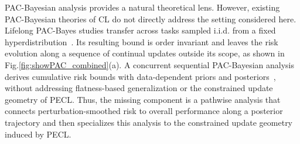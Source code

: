 \documentclass{article}
\begin{document}

PAC-Bayesian analysis provides a natural theoretical lens. However, existing PAC-Bayesian theories of CL do not directly address the setting considered here. Lifelong PAC-Bayes studies transfer across tasks sampled i.i.d. from a fixed hyperdistribution~\cite{pentinaPACBayesianBoundLifelong2014}. Its resulting bound is order invariant and leaves the risk evolution along a sequence of continual updates outside its scope, as shown in Fig.\ref{fig:showPAC_combined}(a). A concurrent sequential PAC-Bayesian analysis derives cumulative risk bounds with data-dependent priors and posteriors~\cite{friedman2026pac}, without addressing flatness-based generalization or the constrained update geometry of PECL.
Thus, the missing component is a pathwise analysis that connects perturbation-smoothed risk to overall performance along a posterior trajectory and then specializes this analysis to the constrained update geometry induced by PECL.
\end{document}
